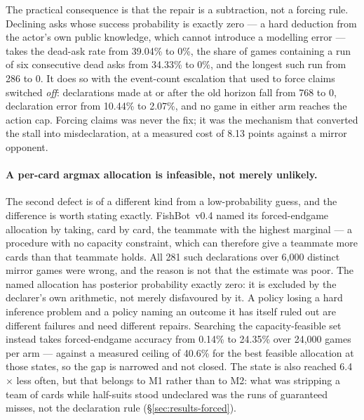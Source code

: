 \documentclass[11pt]{article}
\theoremstyle{definition}
\DeclareRobustCommand{\vfour}{\texorpdfstring{\mbox{FishBot v0.4}}{FishBot v0.4}}
\providecommand{\numForcedGames}{6{,}000}
\providecommand{\numForcedN}{281}
\providecommand{\numFeasibleRight}{40.6}
\providecommand{\numStageTwoCost}{8.13}
\providecommand{\numFourDeadAsk}{39.04}
\providecommand{\numFourDeadRunGames}{34.33}
\providecommand{\numFourDeadRunLongest}{286}
\providecommand{\numFourDeclWrong}{10.44}
\providecommand{\numFourPostHorizonDecl}{768}
\providecommand{\numFiveDeadAsk}{0}
\providecommand{\numFiveDeadRunGames}{0}
\providecommand{\numFiveDeadRunLongest}{0}
\providecommand{\numFiveDeclWrong}{2.07}
\providecommand{\numFivePostHorizonDecl}{0}
\providecommand{\numVfiveForcedAcc}{24.35}
\providecommand{\numVfourForcedAcc}{0.14}
\providecommand{\numForcedRateRatio}{6.4}
\providecommand{\numForcedEightGames}{24{,}000}
\begin{document}
The practical consequence is that the repair is a subtraction, not a forcing
rule. Declining asks whose success probability is exactly zero --- a hard
deduction from the actor's own public knowledge, which cannot introduce a
modelling error --- takes the dead-ask rate from \numFourDeadAsk\% to
\numFiveDeadAsk\%, the share of games containing a run of six consecutive dead
asks from \numFourDeadRunGames\% to \numFiveDeadRunGames\%, and the longest such
run from \numFourDeadRunLongest{} to \numFiveDeadRunLongest{}. It does so with
the event-count escalation that used to force claims switched \emph{off}:
declarations made at or after the old horizon fall from
\numFourPostHorizonDecl{} to \numFivePostHorizonDecl{}, declaration error from
\numFourDeclWrong\% to \numFiveDeclWrong\%, and no game in either arm reaches
the action cap. Forcing claims was never the fix; it was the mechanism that
converted the stall into misdeclaration, at a measured cost of
\numStageTwoCost{} points against a mirror opponent.

\paragraph{A per-card argmax allocation is infeasible, not merely unlikely.}
The second defect is of a different kind from a low-probability guess, and the
difference is worth stating exactly. \vfour{} named its forced-endgame
allocation by taking, card by card, the teammate with the highest marginal ---
a procedure with no capacity constraint, which can therefore give a teammate
more cards than that teammate holds. All \numForcedN{} such declarations over
\numForcedGames{} distinct mirror games were wrong, and the reason is not that
the estimate was poor. The named allocation has posterior probability exactly
zero: it is excluded by the declarer's own arithmetic, not merely disfavoured by
it. A policy losing a hard inference problem and a policy naming an outcome it
has itself ruled out are different failures and need different repairs. Searching
the capacity-feasible set instead takes forced-endgame accuracy from
\numVfourForcedAcc\% to \numVfiveForcedAcc\% over \numForcedEightGames{} games
per arm --- against a measured ceiling of \numFeasibleRight\% for the best
feasible allocation at those states, so the gap is narrowed and not closed. The
state is also reached \numForcedRateRatio$\times$ less often, but that belongs to
M1 rather than to M2: what was stripping a team of cards while half-suits stood
undeclared was the runs of guaranteed misses, not the declaration rule
(\S\ref{sec:results-forced}).
\end{document}
